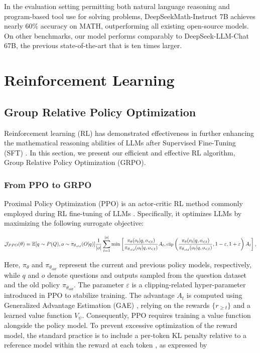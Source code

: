 In the evaluation setting permitting both natural language reasoning and program-based tool use for solving problems, DeepSeekMath-Instruct 7B achieves nearly 60\% accuracy on MATH, outperforming all existing open-source models. On other benchmarks, our model performs comparably to DeepSeek-LLM-Chat 67B, the previous state-of-the-art that is ten times larger.
\section{Reinforcement Learning}

\subsection{Group Relative Policy Optimization} Reinforcement learning (RL) has demonstrated effectiveness in further enhancing the mathematical reasoning abilities of LLMs after Supervised Fine-Tuning (SFT) \citep{wang2023math,wizardmath}. In this section, we present our efficient and effective RL algorithm, Group Relative Policy Optimization (GRPO).

\subsubsection{From PPO to GRPO} Proximal Policy Optimization (PPO) \citep{schulman2017proximal} is an actor-critic RL method commonly employed during RL fine-tuning of LLMs \citep{ouyang2022training}. Specifically, it optimizes LLMs by maximizing the following surrogate objective:

\begin{equation}
\footnotesize
    \mathcal{J}_{PPO}(\theta) = \mathbb{E}{[q \sim P(Q), o \sim \pi_{\theta_{old}}(O|q)]} \frac{1}{|o|} \sum_{t=1}^{|o|} \min \left[ \frac{\pi_\theta(o_{t} | q, o_{<t})}{\pi_{\theta_{old}}(o_{t} | q, o_{<t})} A_{t}, \text{clip} \left( \frac{\pi_\theta(o_{t} | q, o_{<t})}{\pi_{\theta_{old}}(o_{t} | q, o_{<t})}, 1 - \varepsilon, 1 + \varepsilon \right)  A_{t} \right] ,
\end{equation}

Here, $\pi_{\theta}$ and $\pi_{\theta_{old}}$ represent the current and previous policy models, respectively, while $q$ and $o$ denote questions and outputs sampled from the question dataset and the old policy $\pi_{\theta_{old}}$. The parameter $\varepsilon$ is a clipping-related hyper-parameter introduced in PPO to stabilize training. The advantage $A_t$ is computed using Generalized Advantage Estimation (GAE) \citep{gae}, relying on the rewards $\{r_{\ge t}\}$ and a learned value function $V_{\psi}$. Consequently, PPO requires training a value function alongside the policy model. To prevent excessive optimization of the reward model, the standard practice is to include a per-token KL penalty relative to a reference model within the reward at each token \citep{ouyang2022training}, as expressed by

